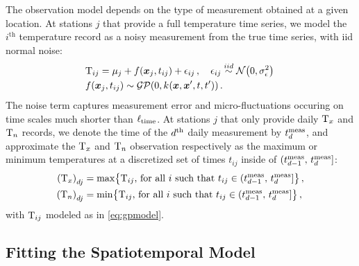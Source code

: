 \documentclass[12pt]{article}
\begin{document}
The observation model depends on the type of measurement obtained at a given location.
At stations \(j\) that provide a full temperature time series, we model the \(i^{\mathrm{th}}\) temperature record as a noisy measurement from the true time series, with iid normal noise:
\begin{equation}
\begin{split}
    & \T_{ij} = \mu_{j} + f(\xvec_j, t_{ij}) + \epsilon_{ij}\,,\quad
    \epsilon_{ij} \overset{\iid}{\sim} \normal\del{0,\sigman^2}\,\\
    & f(\xvec_j, t_{ij}) \sim \GP\del{0, k_{}(\xvec,\xvec',t,t')}\,.\\
\end{split}
\label{eq:gpmodel}
\end{equation}
The noise term captures measurement error and micro-fluctuations occuring on time scales much shorter than \(\ell_{\mathrm{time}}\).
At stations \(j\) that only provide daily \(\mathrm{T}_{x}\) and \(\mathrm{T}_{n}\) records, 
we denote the time of the \(d^{\mathrm{th}}\) daily measurement by \(t^{\mathrm{meas}}_{d}\), 
and approximate the \(\mathrm{T}_{x}\) and \(\mathrm{T}_{n}\) observation respectively as the maximum or minimum temperatures at a discretized set of times \(t_{ij}\) inside of \((t^{\mathrm{meas}}_{d-1},\,t^{\mathrm{meas}}_{d}]\):
\begin{equation}
\begin{split}
    \del{\Tx}_{\iday j} &= \max\cbr{\T_{ij}\text{, for all \(i\) such that } t_{ij} \in \dayset{\iday}} \,,\\
    \del{\Tn}_{\iday j} &= \min\cbr{\T_{ij}\text{, for all \(i\) such that } t_{ij} \in \dayset{\iday}} \,,
\end{split}
\label{eq:obs_Tn_Tx}
\end{equation}
with \(\mathrm{T}_{ij}\) modeled as in \autoref{eq:gpmodel}.

\subsection{Fitting the Spatiotemporal Model}\label{fitting-the-spatiotemporal-model}
\end{document}
